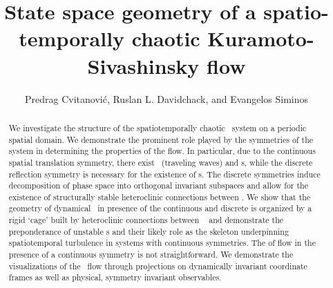 \documentclass{siamltex}          %
\begin{document}
                \title{
State space geometry of a spatio-temporally chaotic
Kuramoto-Sivashinsky flow
                 }
                  \author{
Predrag Cvitanovi\'c\footnotemark[1],
Ruslan L. Davidchack\footnotemark[2],
    and
Evangelos Siminos\footnotemark[1]
                    }


                \maketitle

\renewcommand{\thefootnote}{\fnsymbol{footnote}}
\renewcommand{\thefootnote}{\arabic{footnote}}

                \begin{abstract}
We investigate the structure of the spatiotemporally chaotic \KS\
system on a periodic spatial domain.  We demonstrate the prominent
role played by the symmetries of the system in determining the
properties of the flow.  In particular, due to the continuous spatial
translation symmetry, there exist \reqva\ (traveling waves) and \rpo
s, while the discrete reflection symmetry is necessary for the
existence of \po s.  The discrete symmetries induce decomposition 
of phase space into orthogonal invariant subspaces and allow for the 
existence of structurally stable heteroclinic connections between \eqva . 
We show %
that the geometry of  dynamical \statesp\ in presence of the
continuous and discrete \PCedit{symmetries} is organized by a rigid
`cage' built by heteroclinic connections between \eqva\ %
and demonstrate the preponderance of unstable \rpo s and their likely
role as the skeleton underpinning spatiotemporal turbulence in systems
with continuous symmetries.
The  of flow in the presence of a continuous symmetry is
not straightforward.  We demonstrate the visualizations of the \KS\ flow 
through projections on dynamically invariant coordinate frames as well
as physical, symmetry invariant observables.

                \end{abstract}
\end{document}
